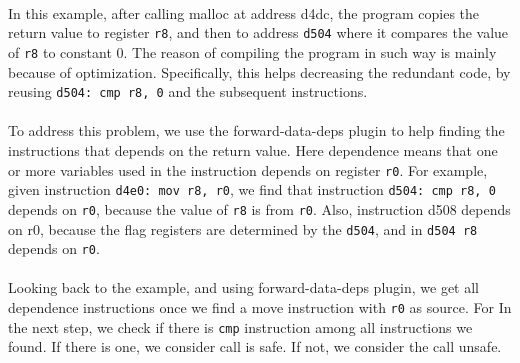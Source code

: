 \paragraph{}
In this example, after calling malloc at address d4dc, the program copies the
return value to register \texttt{r8}, and then to address \texttt{d504} where
it compares the value of \texttt{r8} to constant 0. The reason of compiling the
program in such way is mainly because of optimization. Specifically, this
helps decreasing the redundant code, by reusing \texttt{d504: cmp r8, 0} and
the subsequent instructions.

\paragraph{}
To address this problem, we use the forward-data-deps plugin to help finding the
instructions that depends on the return value. Here dependence means that one or
more variables used in the instruction depends on register \texttt{r0}. For
example, given instruction \texttt{d4e0: mov r8, r0}, we find that instruction
\texttt{d504: cmp r8, 0} depends on \texttt{r0}, because the value of
\texttt{r8} is from \texttt{r0}. Also, instruction d508 depends on r0, because
the flag registers are determined by
the \texttt{d504}, and in \texttt{d504 r8} depends on \texttt{r0}.

\paragraph{}
Looking back to the example, and using forward-data-deps plugin, we get all
dependence instructions once we find a move instruction with \texttt{r0} as
source. For In the next step, we check if there is \texttt{cmp} instruction
among all instructions we found. If there is one, we consider call is safe. If
not, we consider the call unsafe.
